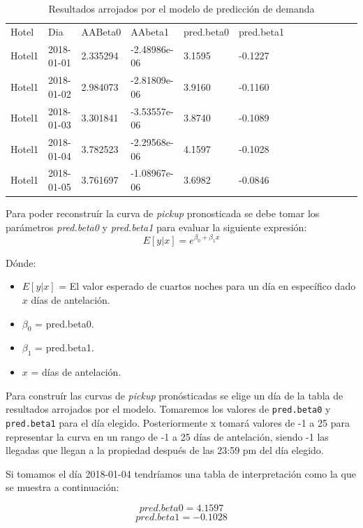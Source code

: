 \begin{table}[H]
\begin{tabular}{lllllllllllll}
Hotel  & Dia         & AABeta0  & AAbeta1      & pred.beta0 & pred.beta1  \\
Hotel1 & 2018-01-01  & 2.335294 & -2.48986e-06 & 3.1595     & -0.1227     \\
Hotel1 & 2018-01-02  & 2.984073 & -2.81809e-06 & 3.9160     & -0.1160     \\
Hotel1 & 2018-01-03  & 3.301841 & -3.53557e-06 & 3.8740     & -0.1089     \\
Hotel1 & 2018-01-04  & 3.782523 & -2.29568e-06 & 4.1597     & -0.1028     \\
Hotel1 & 2018-01-05 & 3.761697 & -1.08967e-06 & 3.6982     & -0.0846    
\end{tabular}
\caption{Resultados arrojados por el modelo de predicción de demanda} 
\end{table}

Para poder reconstruír la curva de \emph{pickup} pronosticada se debe tomar los parámetros \emph{pred.beta0} y \emph{pred.beta1} para evaluar la siguiente expresión: $$E[y|x]=e^{\beta_0 + \beta_1x}$$

Dónde:
\begin{itemize}[noitemsep]
\item $E[y|x]$ = El valor esperado de cuartos noches para un día en específico dado $x$ días de antelación.
\item $\beta_0$ = pred.beta0.
\item $\beta_1$ = pred.beta1.
\item $x$ = días de antelación.
\end{itemize}

Para construír las curvas de \emph{pickup} pronósticadas se elige un día de la tabla de resultados arrojados por el modelo. Tomaremos los valores de \texttt{pred.beta0} y \texttt{pred.beta1} para el día elegido. Posteriormente x tomará valores de -1 a 25 para representar la curva en un rango de -1 a 25 días de antelación, siendo -1 las llegadas que llegan a la propiedad después de las 23:59 pm del día elegido.

Si tomamos el día 2018-01-04 tendríamos una tabla de interpretación como la que se muestra a continuación:

$$pred.beta0 = 4.1597$$ $$pred.beta1 = -0.1028$$

